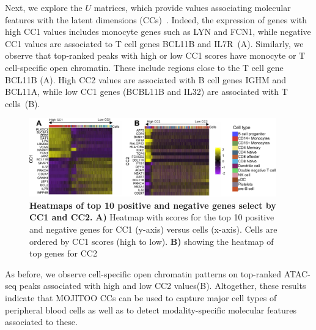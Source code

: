 Next, we explore the $U$ matrices, which provide values associating molecular features with the latent dimensions (CCs)~. Indeed, the expression of genes with high CC1 values includes monocyte genes such as LYN and FCN1, while negative CC1 values are associated to T cell genes BCL11B and IL7R~(A). Similarly, we observe that top-ranked peaks with high or low CC1 scores have monocyte or T cell-specific open chromatin. These include regions close to the T cell gene BCL11B (A). High CC2 values are associated with B cell genes IGHM and BCL11A, while low CC1 genes (BCBL11B and IL32) are associated with T cells~(B). 

\begin{figure}[!h]
	\centering
	\includegraphics[width=0.95\textwidth]{CC_Genes/fig}
	\vspace{0.1cm}
	\caption[Heatmaps of top 10 positive and negative genes select by CC1 and CC2.]{\textbf{Heatmaps of top 10 positive and negative genes select by CC1 and CC2.} \textbf{A)} Heatmap with scores for the top 10 positive and negative genes for CC1 (y-axis) versus cells (x-axis). Cells are ordered by CC1 scores (high to low). \textbf{B)} showing the heatmap of top genes for CC2}
	\label{fig:CC_Genes}
\end{figure}

As before, we observe cell-specific open chromatin patterns on top-ranked ATAC-seq peaks associated with high and low CC2 values(B). Altogether, these results indicate that MOJITOO CCs can be used to capture major cell types of peripheral blood cells as well as to detect modality-specific molecular features associated to these.

